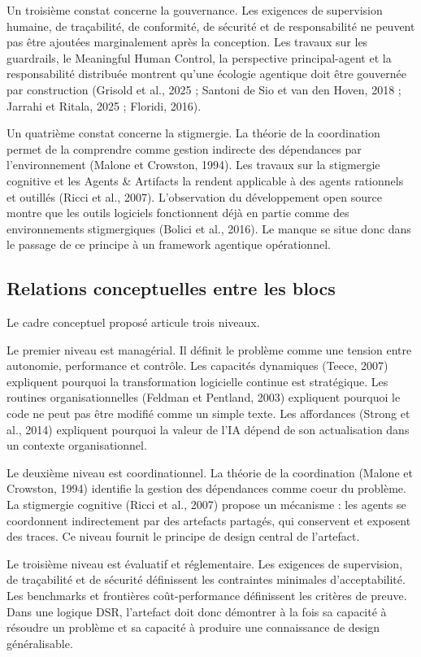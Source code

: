 Un troisième constat concerne la gouvernance. Les exigences de supervision humaine, de traçabilité, de conformité, de sécurité et de responsabilité ne peuvent pas être ajoutées marginalement après la conception. Les travaux sur les guardrails, le Meaningful Human Control, la perspective principal-agent et la responsabilité distribuée montrent qu'une écologie agentique doit être gouvernée par construction (Grisold et al., 2025 ; Santoni de Sio et van den Hoven, 2018 ; Jarrahi et Ritala, 2025 ; Floridi, 2016).

Un quatrième constat concerne la stigmergie. La théorie de la coordination permet de la comprendre comme gestion indirecte des dépendances par l'environnement (Malone et Crowston, 1994). Les travaux sur la stigmergie cognitive et les Agents \& Artifacts la rendent applicable à des agents rationnels et outillés (Ricci et al., 2007). L'observation du développement open source montre que les outils logiciels fonctionnent déjà en partie comme des environnements stigmergiques (Bolici et al., 2016). Le manque se situe donc dans le passage de ce principe à un framework agentique opérationnel.

\subsection{Relations conceptuelles entre les blocs}\label{relations-conceptuelles-entre-les-blocs}

Le cadre conceptuel proposé articule trois niveaux.

Le premier niveau est managérial. Il définit le problème comme une tension entre autonomie, performance et contrôle. Les capacités dynamiques (Teece, 2007) expliquent pourquoi la transformation logicielle continue est stratégique. Les routines organisationnelles (Feldman et Pentland, 2003) expliquent pourquoi le code ne peut pas être modifié comme un simple texte. Les affordances (Strong et al., 2014) expliquent pourquoi la valeur de l'IA dépend de son actualisation dans un contexte organisationnel.

Le deuxième niveau est coordinationnel. La théorie de la coordination (Malone et Crowston, 1994) identifie la gestion des dépendances comme coeur du problème. La stigmergie cognitive (Ricci et al., 2007) propose un mécanisme : les agents se coordonnent indirectement par des artefacts partagés, qui conservent et exposent des traces. Ce niveau fournit le principe de design central de l'artefact.

Le troisième niveau est évaluatif et réglementaire. Les exigences de supervision, de traçabilité et de sécurité définissent les contraintes minimales d'acceptabilité. Les benchmarks et frontières coût-performance définissent les critères de preuve. Dans une logique DSR, l'artefact doit donc démontrer à la fois sa capacité à résoudre un problème et sa capacité à produire une connaissance de design généralisable.

